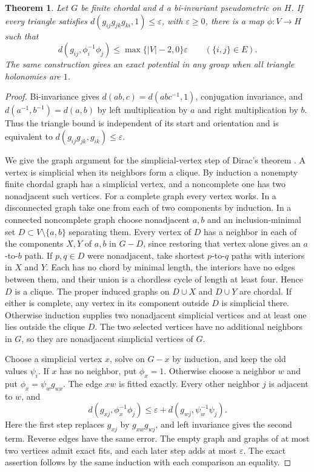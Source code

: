 \documentclass[11pt,reqno]{amsart}
\newtheorem{theorem}{Theorem}[section]
\theoremstyle{definition}
\theoremstyle{remark}
\numberwithin{equation}{section}
\begin{document}
\begin{theorem}\label{m1:chordal}
Let \(G\) be finite chordal and \(d\) a bi-invariant pseudometric
on \(H\). If every triangle satisfies
\(d(g_{ij}g_{jk}g_{ki},1)\le\varepsilon\), with \(\varepsilon\ge0\),
there is a map \(\phi:V\to H\) such that
\begin{equation}\label{m1:stab-eq}
 d(g_{ij},\phi_i^{-1}\phi_j)
 \le \max\{|V|-2,0\}\varepsilon\qquad(\{i,j\}\in E).
\end{equation}
The same construction gives an exact potential in any group
when all triangle holonomies are \(1\).
\end{theorem}
\begin{proof}
Bi-invariance gives \(d(ab,c)=d(abc^{-1},1)\), conjugation
invariance, and \(d(a^{-1},b^{-1})=d(a,b)\) by left multiplication
by \(a\) and right multiplication by \(b\). Thus the triangle
bound is independent of its start and orientation and is equivalent
to \(d(g_{ij}g_{jk},g_{ik})\le\varepsilon\).

We give the graph argument for the simplicial-vertex step of
Dirac's theorem \cite{m1:Dirac}. A vertex is simplicial when its
neighbors form a clique. By induction a nonempty finite chordal graph
has a simplicial vertex, and a noncomplete one has two nonadjacent
such vertices. For a complete graph every vertex works. In a
disconnected graph take one from each of two components by induction.
In a connected noncomplete graph choose nonadjacent \(a,b\) and an
inclusion-minimal set \(D\subset V\setminus\{a,b\}\) separating
them. Every vertex of \(D\) has a neighbor in each of the components
\(X,Y\) of \(a,b\) in \(G-D\), since restoring that vertex alone
gives an \(a\)-to-\(b\) path. If \(p,q\in D\) were nonadjacent,
take shortest \(p\)-to-\(q\) paths with interiors in \(X\) and \(Y\).
Each has no chord by minimal length, the interiors have no edges
between them, and their union is a chordless cycle of length at
least four. Hence \(D\) is a clique. The proper induced graphs on
\(D\cup X\) and \(D\cup Y\) are chordal. If either is complete,
any vertex in its component outside \(D\) is simplicial there.
Otherwise induction supplies two nonadjacent simplicial vertices
and at least one lies outside the clique \(D\). The two selected
vertices have no additional neighbors in \(G\), so they are
nonadjacent simplicial vertices of \(G\).

Choose a simplicial vertex \(x\), solve on \(G-x\) by induction,
and keep the old values \(\psi_i\). If \(x\) has no neighbor, put
\(\phi_x=1\). Otherwise choose a neighbor \(w\) and put
\(\phi_x=\psi_w g_{wx}\). The edge \(xw\) is fitted exactly.
Every other neighbor \(j\) is adjacent to \(w\), and
\[
 d(g_{xj},\phi_x^{-1}\phi_j)
 \le \varepsilon+d(g_{wj},\psi_w^{-1}\psi_j).
\]
Here the first step replaces \(g_{xj}\) by \(g_{xw}g_{wj}\), and
left invariance gives the second term. Reverse edges have the same
error. The empty graph and graphs of at most two vertices admit
exact fits, and each later step adds at most \(\varepsilon\).
The exact assertion follows by the same induction with each
comparison an equality.
\end{proof}
\end{document}
